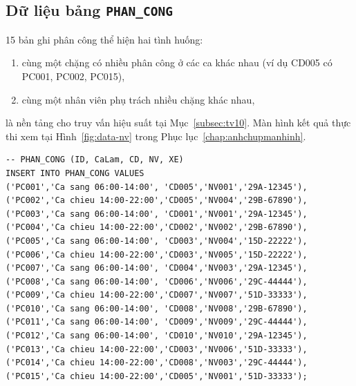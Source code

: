 \documentclass[11pt]{report}
\begin{document}

\subsection{Dữ liệu bảng \texttt{PHAN\_CONG}}

15 bản ghi phân công thể hiện hai tình huống: 
\begin{enumerate}
    \item cùng một chặng có nhiều phân công ở các ca khác nhau (ví dụ CD005 có PC001, PC002, PC015),
    
    \item cùng một nhân viên phụ trách nhiều chặng khác nhau,
\end{enumerate}
là nền tảng cho truy vấn hiệu suất tại Mục~\ref{subsec:tv10}. Màn hình kết quả thực thi xem tại Hình~\ref{fig:data-nv} trong Phục lục~\ref{chap:anhchupmanhinh}.

\begin{verbatim}
-- PHAN_CONG (ID, CaLam, CD, NV, XE)
INSERT INTO PHAN_CONG VALUES
('PC001','Ca sang 06:00-14:00', 'CD005','NV001','29A-12345'),
('PC002','Ca chieu 14:00-22:00','CD005','NV004','29B-67890'),
('PC003','Ca sang 06:00-14:00', 'CD001','NV001','29A-12345'),
('PC004','Ca chieu 14:00-22:00','CD002','NV002','29B-67890'),
('PC005','Ca sang 06:00-14:00', 'CD003','NV004','15D-22222'),
('PC006','Ca chieu 14:00-22:00','CD003','NV005','15D-22222'),
('PC007','Ca sang 06:00-14:00', 'CD004','NV003','29A-12345'),
('PC008','Ca sang 06:00-14:00', 'CD006','NV006','29C-44444'),
('PC009','Ca chieu 14:00-22:00','CD007','NV007','51D-33333'),
('PC010','Ca sang 06:00-14:00', 'CD008','NV008','29B-67890'),
('PC011','Ca sang 06:00-14:00', 'CD009','NV009','29C-44444'),
('PC012','Ca sang 06:00-14:00', 'CD010','NV010','29A-12345'),
('PC013','Ca chieu 14:00-22:00','CD003','NV006','51D-33333'),
('PC014','Ca chieu 14:00-22:00','CD008','NV003','29C-44444'),
('PC015','Ca chieu 14:00-22:00','CD005','NV001','51D-33333');
\end{verbatim}
\end{document}
